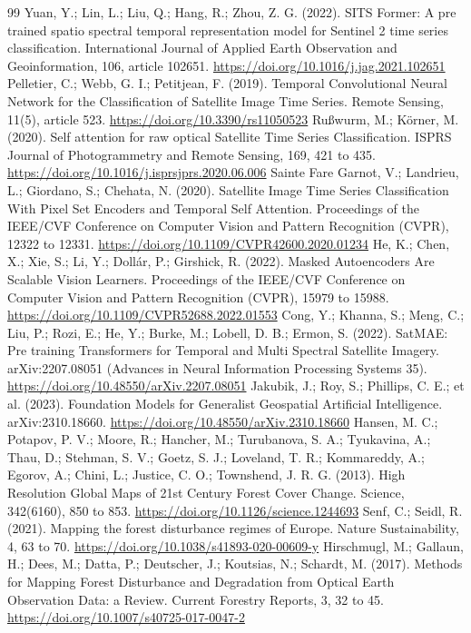 \documentclass[10pt,a4paper,twocolumn]{article}
\begin{document}
\begin{thebibliography}{99}
 Yuan, Y.; Lin, L.; Liu, Q.; Hang, R.; Zhou, Z. G. (2022). SITS Former: A pre trained spatio spectral temporal representation model for Sentinel 2 time series classification. International Journal of Applied Earth Observation and Geoinformation, 106, article 102651. \url{https://doi.org/10.1016/j.jag.2021.102651}
 Pelletier, C.; Webb, G. I.; Petitjean, F. (2019). Temporal Convolutional Neural Network for the Classification of Satellite Image Time Series. Remote Sensing, 11(5), article 523. \url{https://doi.org/10.3390/rs11050523}
 Rußwurm, M.; Körner, M. (2020). Self attention for raw optical Satellite Time Series Classification. ISPRS Journal of Photogrammetry and Remote Sensing, 169, 421 to 435. \url{https://doi.org/10.1016/j.isprsjprs.2020.06.006}
 Sainte Fare Garnot, V.; Landrieu, L.; Giordano, S.; Chehata, N. (2020). Satellite Image Time Series Classification With Pixel Set Encoders and Temporal Self Attention. Proceedings of the IEEE/CVF Conference on Computer Vision and Pattern Recognition (CVPR), 12322 to 12331. \url{https://doi.org/10.1109/CVPR42600.2020.01234}
 He, K.; Chen, X.; Xie, S.; Li, Y.; Dollár, P.; Girshick, R. (2022). Masked Autoencoders Are Scalable Vision Learners. Proceedings of the IEEE/CVF Conference on Computer Vision and Pattern Recognition (CVPR), 15979 to 15988. \url{https://doi.org/10.1109/CVPR52688.2022.01553}
 Cong, Y.; Khanna, S.; Meng, C.; Liu, P.; Rozi, E.; He, Y.; Burke, M.; Lobell, D. B.; Ermon, S. (2022). SatMAE: Pre training Transformers for Temporal and Multi Spectral Satellite Imagery. arXiv:2207.08051 (Advances in Neural Information Processing Systems 35). \url{https://doi.org/10.48550/arXiv.2207.08051}
 Jakubik, J.; Roy, S.; Phillips, C. E.; et al. (2023). Foundation Models for Generalist Geospatial Artificial Intelligence. arXiv:2310.18660. \url{https://doi.org/10.48550/arXiv.2310.18660}
 Hansen, M. C.; Potapov, P. V.; Moore, R.; Hancher, M.; Turubanova, S. A.; Tyukavina, A.; Thau, D.; Stehman, S. V.; Goetz, S. J.; Loveland, T. R.; Kommareddy, A.; Egorov, A.; Chini, L.; Justice, C. O.; Townshend, J. R. G. (2013). High Resolution Global Maps of 21st Century Forest Cover Change. Science, 342(6160), 850 to 853. \url{https://doi.org/10.1126/science.1244693}
 Senf, C.; Seidl, R. (2021). Mapping the forest disturbance regimes of Europe. Nature Sustainability, 4, 63 to 70. \url{https://doi.org/10.1038/s41893-020-00609-y}
 Hirschmugl, M.; Gallaun, H.; Dees, M.; Datta, P.; Deutscher, J.; Koutsias, N.; Schardt, M. (2017). Methods for Mapping Forest Disturbance and Degradation from Optical Earth Observation Data: a Review. Current Forestry Reports, 3, 32 to 45. \url{https://doi.org/10.1007/s40725-017-0047-2}

\end{thebibliography}
\end{document}
